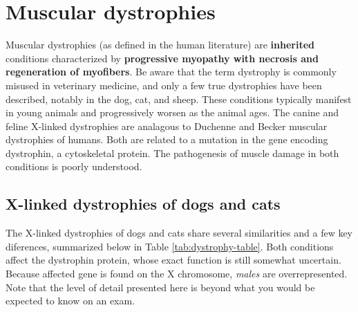 \documentclass[openany]{book}
\begin{document}
\section{Muscular dystrophies}\label{muscular-dystrophies}

Muscular dystrophies (as defined in the human literature) are
\textbf{inherited} conditions characterized by \textbf{progressive
myopathy with necrosis and regeneration of myofibers}. Be aware that the
term dystrophy is commonly misused in veterinary medicine, and only a
few true dystrophies have been described, notably in the dog, cat, and
sheep. These conditions typically manifest in young animals and
progressively worsen as the animal ages. The canine and feline X-linked
dystrophies are analagous to Duchenne and Becker muscular dystrophies of
humans. Both are related to a mutation in the gene encoding dystrophin,
a cytoskeletal protein. The pathogenesis of muscle damage in both
conditions is poorly understood.

\subsection{X-linked dystrophies of dogs and
cats}\label{x-linked-dystrophies-of-dogs-and-cats}

The X-linked dystrophies of dogs and cats share several similarities and
a few key diferences, summarized below in Table
\ref{tab:dystrophy-table}. Both conditions affect the dystrophin
protein, whose exact function is still somewhat uncertain. Because
affected gene is found on the X chromosome, \emph{males} are
overrepresented. Note that the level of detail presented here is beyond
what you would be expected to know on an exam.
\end{document}
